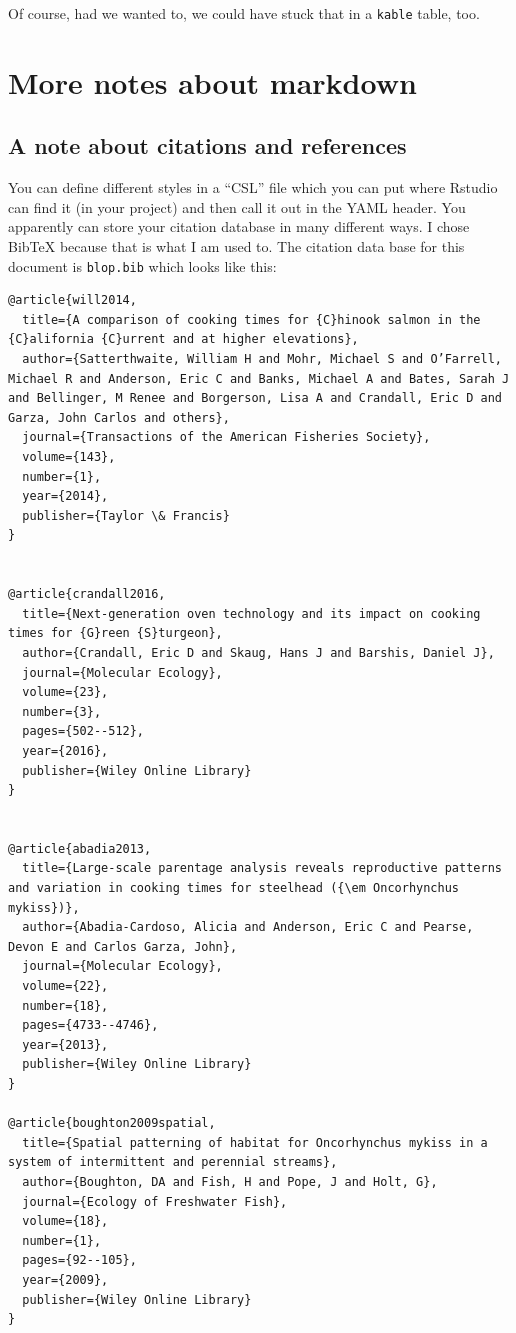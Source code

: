 \documentclass[
]{article}
\begin{document}
Of course, had we wanted to, we could have stuck that in a
\texttt{kable} table, too.

\hypertarget{more-notes-about-markdown}{%
\section{More notes about markdown}\label{more-notes-about-markdown}}

\hypertarget{a-note-about-citations-and-references}{%
\subsection{A note about citations and
references}\label{a-note-about-citations-and-references}}

You can define different styles in a ``CSL'' file which you can put
where Rstudio can find it (in your project) and then call it out in the
YAML header. You apparently can store your citation database in many
different ways. I chose BibTeX because that is what I am used to. The
citation data base for this document is \texttt{blop.bib} which looks
like this:

\begin{verbatim}
@article{will2014,
  title={A comparison of cooking times for {C}hinook salmon in the {C}alifornia {C}urrent and at higher elevations},
  author={Satterthwaite, William H and Mohr, Michael S and O’Farrell, Michael R and Anderson, Eric C and Banks, Michael A and Bates, Sarah J and Bellinger, M Renee and Borgerson, Lisa A and Crandall, Eric D and Garza, John Carlos and others},
  journal={Transactions of the American Fisheries Society},
  volume={143},
  number={1},
  year={2014},
  publisher={Taylor \& Francis}
}


@article{crandall2016,
  title={Next-generation oven technology and its impact on cooking times for {G}reen {S}turgeon},
  author={Crandall, Eric D and Skaug, Hans J and Barshis, Daniel J},
  journal={Molecular Ecology},
  volume={23},
  number={3},
  pages={502--512},
  year={2016},
  publisher={Wiley Online Library}
}


@article{abadia2013,
  title={Large-scale parentage analysis reveals reproductive patterns and variation in cooking times for steelhead ({\em Oncorhynchus mykiss})},
  author={Abadia-Cardoso, Alicia and Anderson, Eric C and Pearse, Devon E and Carlos Garza, John},
  journal={Molecular Ecology},
  volume={22},
  number={18},
  pages={4733--4746},
  year={2013},
  publisher={Wiley Online Library}
}

@article{boughton2009spatial,
  title={Spatial patterning of habitat for Oncorhynchus mykiss in a system of intermittent and perennial streams},
  author={Boughton, DA and Fish, H and Pope, J and Holt, G},
  journal={Ecology of Freshwater Fish},
  volume={18},
  number={1},
  pages={92--105},
  year={2009},
  publisher={Wiley Online Library}
}
\end{verbatim}
\end{document}
